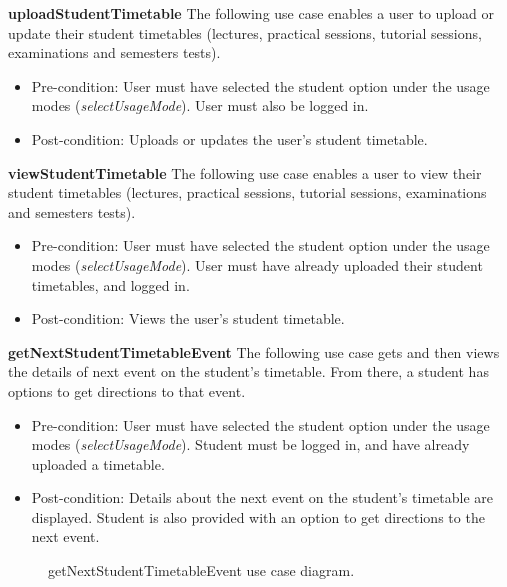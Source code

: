 \documentclass[12pt,a4paper]{article}
\begin{document}
	    \medskip

	    \textbf{uploadStudentTimetable}
		The following use case enables a user to upload or update their student timetables (lectures, practical sessions, 			    tutorial sessions, examinations and semesters tests).

		\begin{itemize}
		  \item Pre-condition: User must have selected the student option under the usage modes (\textit{selectUsageMode}). 					User must also be logged in.
		   \item Post-condition: Uploads or updates the user's student timetable.
		\end{itemize}

	    \textbf{viewStudentTimetable}
		The following use case enables a user to view their student timetables (lectures, practical sessions, tutorial        			sessions, examinations and semesters tests).

		\begin{itemize}
		  \item Pre-condition: User must have selected the student option under the usage modes (\textit{selectUsageMode}). 					User must have already uploaded their student timetables, and logged in.
		   \item Post-condition: Views the user's student timetable.
		\end{itemize}

	    \textbf{getNextStudentTimetableEvent}
		The following use case gets and then views the details of next event on the student's timetable. From there, a student 		has options to get directions to that event.

		\begin{itemize}
		  \item Pre-condition: User must have selected the student option under the usage modes (\textit{selectUsageMode}). 					Student must be logged in, and have already uploaded a timetable.
		   \item Post-condition: Details about the next event on the student's timetable are displayed. Student is also 						 provided with an option to get directions to the next event.
		\end{itemize}

		\begin{figure}[ht!]
				\caption \newline getNextStudentTimetableEvent use case diagram.
		\end{figure}
\end{document}

